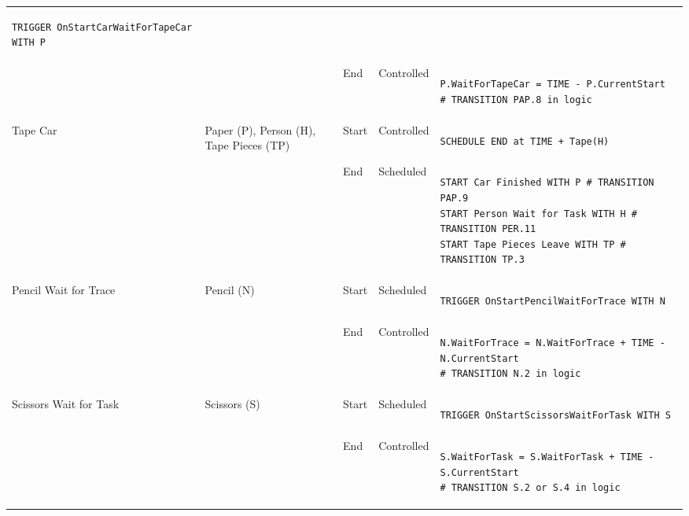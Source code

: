\documentclass[
  10pt,
  a4paperpaper,
  DIV=11,
  numbers=noendperiod,
  oneside]{scrreprt}
\begin{document}
\begin{longtable}{@{}>{\raggedright\arraybackslash}p{1.8cm}>{\raggedright\arraybackslash}p{2.1cm}>{\raggedright\arraybackslash}p{0.9cm}>{\raggedright\arraybackslash}p{2.2cm}>{\raggedright\arraybackslash}p{8.75cm}@{}}
\begin{lstlisting}[language=CMPseudo]
TRIGGER OnStartCarWaitForTapeCar WITH P
\end{lstlisting}             \\
  &                                                          & End   & Controlled & 
\begin{lstlisting}[language=CMPseudo]
P.WaitForTapeCar = TIME - P.CurrentStart
# TRANSITION PAP.8 in logic
\end{lstlisting}             \\ \midrule
  Tape Car                  & Paper (P), Person (H), Tape Pieces (TP) & Start & Controlled  & 
\begin{lstlisting}[language=CMPseudo]
SCHEDULE END at TIME + Tape(H)
\end{lstlisting}             \\
  &                                                          & End   & Scheduled &
\begin{lstlisting}[language=CMPseudo]
START Car Finished WITH P # TRANSITION PAP.9
START Person Wait for Task WITH H # TRANSITION PER.11
START Tape Pieces Leave WITH TP # TRANSITION TP.3
\end{lstlisting}              \\ \midrule
  Pencil Wait for Trace    & Pencil (N)                             & Start & Scheduled  & 
\begin{lstlisting}[language=CMPseudo]
TRIGGER OnStartPencilWaitForTrace WITH N
\end{lstlisting}             \\
  &                                                          & End   & Controlled & 
\begin{lstlisting}[language=CMPseudo]
N.WaitForTrace = N.WaitForTrace + TIME - N.CurrentStart
# TRANSITION N.2 in logic
\end{lstlisting}             \\ \midrule
  Scissors Wait for Task    & Scissors (S)                            & Start & Scheduled  & 
\begin{lstlisting}[language=CMPseudo]
TRIGGER OnStartScissorsWaitForTask WITH S
\end{lstlisting}             \\
  &                                                          & End   & Controlled & 
\begin{lstlisting}[language=CMPseudo]
S.WaitForTask = S.WaitForTask + TIME - S.CurrentStart
# TRANSITION S.2 or S.4 in logic
\end{lstlisting}             \\ \midrule

\end{longtable}
\end{document}
